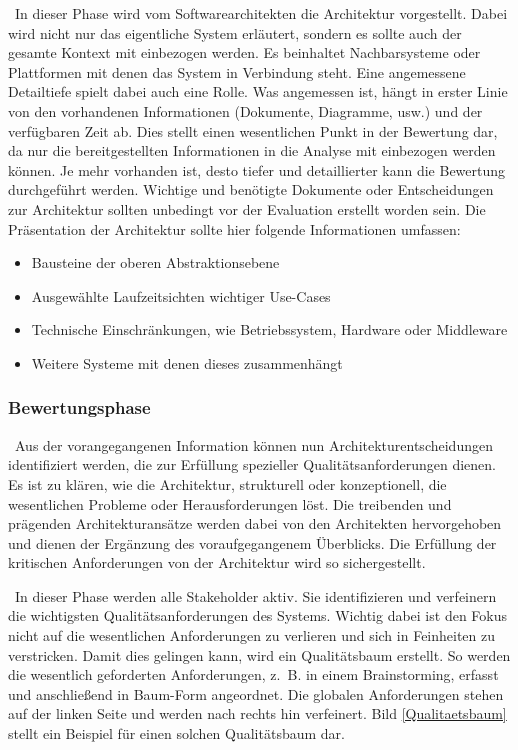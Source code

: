 \
In dieser Phase wird vom Softwarearchitekten die Architektur vorgestellt. Dabei wird nicht nur das eigentliche System erläutert, sondern es sollte auch der gesamte Kontext mit einbezogen werden\cite{Starke2015}. Es beinhaltet Nachbarsysteme oder Plattformen mit denen das System in Verbindung steht. Eine angemessene Detailtiefe spielt dabei auch eine Rolle. Was angemessen ist, hängt in erster Linie von den vorhandenen Informationen (Dokumente, Diagramme, usw.) und der verfügbaren Zeit ab. Dies stellt einen wesentlichen Punkt in der Bewertung dar\cite{Clements2000}, da nur die bereitgestellten Informationen in die Analyse mit einbezogen werden können. Je mehr vorhanden ist, desto tiefer und detaillierter kann die Bewertung durchgeführt werden. Wichtige und benötigte Dokumente oder Entscheidungen zur Architektur sollten unbedingt vor der Evaluation erstellt worden sein.
Die Präsentation der Architektur sollte hier folgende Informationen umfassen\cites{Clements2000}{Starke2015}:

\begin{itemize}[]
	\item Bausteine der oberen Abstraktionsebene
	\item Ausgewählte Laufzeitsichten wichtiger Use-Cases
	\item Technische Einschränkungen, wie Betriebssystem, Hardware oder Middleware
	\item Weitere Systeme mit denen dieses zusammenhängt 
\end{itemize}
\subsubsection{Bewertungsphase}
\
Aus der vorangegangenen Information können nun Architekturentscheidungen identifiziert werden, die zur Erfüllung spezieller Qualitätsanforderungen dienen. Es ist zu klären, wie die Architektur, strukturell oder konzeptionell, die wesentlichen Probleme oder Herausforderungen löst. Die treibenden und prägenden Architekturansätze werden dabei von den Architekten hervorgehoben und dienen der Ergänzung des voraufgegangenem Überblicks\cite{Starke2015}.
Die Erfüllung der kritischen Anforderungen von der Architektur wird so sichergestellt.

\newparagraph{Bildung eines Qualitätsbaumes (Quality Utility Tree)}
\
In dieser Phase werden alle Stakeholder aktiv. Sie identifizieren und verfeinern die wichtigsten Qualitätsanforderungen des Systems. Wichtig dabei ist den Fokus nicht auf die wesentlichen Anforderungen zu verlieren und sich in Feinheiten zu verstricken\cite{Clements2000}. Damit dies gelingen kann, wird ein Qualitätsbaum erstellt.
So werden die wesentlich geforderten Anforderungen, z.~B. in einem Brainstorming, erfasst und anschließend in Baum-Form angeordnet. Die globalen Anforderungen stehen auf der linken Seite und werden nach rechts hin verfeinert. Bild \ref{Qualitaetsbaum} stellt ein Beispiel für einen solchen Qualitätsbaum dar. 

